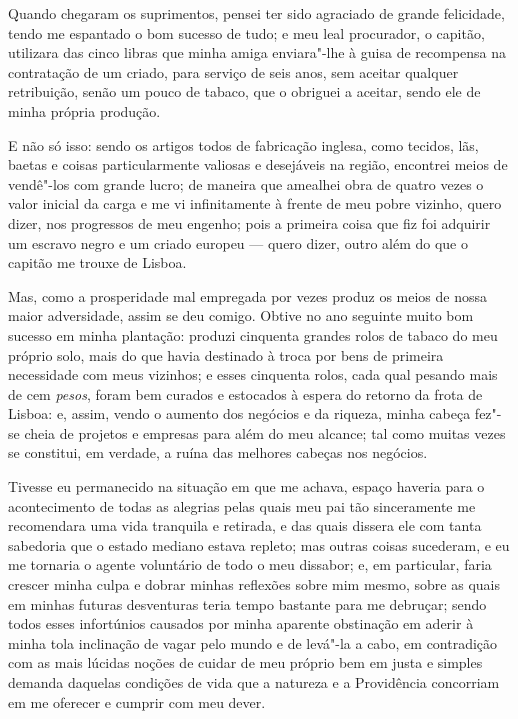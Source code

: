 Quando chegaram os suprimentos, pensei ter sido agraciado de grande
felicidade, tendo me espantado o bom sucesso de tudo; e meu leal
procurador, o capitão, utilizara das cinco libras que minha amiga
enviara"-lhe à guisa de recompensa na contratação de um criado, para
serviço de seis anos, sem aceitar qualquer retribuição, senão um pouco
de tabaco, que o obriguei a aceitar, sendo ele de minha própria
produção.

E não só isso: sendo os artigos todos de fabricação inglesa, como
tecidos, lãs, baetas e coisas particularmente valiosas e desejáveis na
região, encontrei meios de vendê"-los com grande lucro; de maneira que
amealhei obra de quatro vezes o valor inicial da carga e me vi
infinitamente à frente de meu pobre vizinho, quero dizer, nos progressos
de meu engenho; pois a primeira coisa que fiz foi adquirir um escravo
negro e um criado europeu --- quero dizer, outro além do que o capitão me
trouxe de Lisboa.

Mas, como a prosperidade mal empregada por vezes produz os meios de
nossa maior adversidade, assim se deu comigo. Obtive no ano seguinte
muito bom sucesso em minha plantação: produzi cinquenta grandes rolos de
tabaco do meu próprio solo, mais do que havia destinado à troca por bens
de primeira necessidade com meus vizinhos; e esses cinquenta rolos, cada
qual pesando mais de cem \emph{pesos}, foram bem curados e estocados à
espera do retorno da frota de Lisboa: e, assim, vendo o aumento dos
negócios e da riqueza, minha cabeça fez"-se cheia de projetos e empresas
para além do meu alcance; tal como muitas vezes se constitui, em
verdade, a ruína das melhores cabeças nos negócios.

Tivesse eu permanecido na situação em que me achava, espaço haveria para
o acontecimento de todas as alegrias pelas quais meu pai tão
sinceramente me recomendara uma vida tranquila e retirada, e das quais
dissera ele com tanta sabedoria que o estado mediano estava repleto; mas
outras coisas sucederam, e eu me tornaria o agente voluntário de todo o
meu dissabor; e, em particular, faria crescer minha culpa e dobrar
minhas reflexões sobre mim mesmo, sobre as quais em minhas futuras
desventuras teria tempo bastante para me debruçar; sendo todos esses
infortúnios causados por minha aparente obstinação em aderir à minha
tola inclinação de vagar pelo mundo e de levá"-la a cabo, em contradição
com as mais lúcidas noções de cuidar de meu próprio bem em justa e
simples demanda daquelas condições de vida que a natureza e a
Providência concorriam em me oferecer e cumprir com meu dever.

